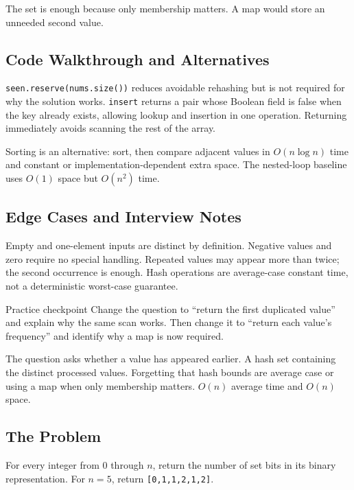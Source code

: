 The set is enough because only membership matters. A map would store an
unneeded second value.

\subsection{Code Walkthrough and Alternatives}
\texttt{seen.reserve(nums.size())} reduces avoidable rehashing but is not
required for why the solution works. \texttt{insert} returns a pair whose Boolean field
is false when the key already exists, allowing lookup and insertion in one
operation. Returning immediately avoids scanning the rest of the array.

Sorting is an alternative: sort, then compare adjacent values in
\(O(n\log n)\) time and constant or implementation-dependent extra space.
The nested-loop baseline uses \(O(1)\) space but \(O(n^2)\) time.

\subsection{Edge Cases and Interview Notes}
Empty and one-element inputs are distinct by definition. Negative values and
zero require no special handling. Repeated values may appear more than twice;
the second occurrence is enough. Hash operations are average-case constant
time, not a deterministic worst-case guarantee.

\begin{revisionbox}{Practice checkpoint}
Change the question to ``return the first duplicated value'' and explain why
the same scan works. Then change it to ``return each value's frequency'' and
identify why a map is now required.
\end{revisionbox}
\chaptercheckpoint
  {The question asks whether a value has appeared earlier.}
  {A hash set containing the distinct processed values.}
  {Forgetting that hash bounds are average case or using a map when only membership matters.}
  {$O(n)$ average time and $O(n)$ space.}
\judgeclassnote



\subsection{The Problem}
For every integer from \(0\) through \(n\), return the number of set bits in
its binary representation. For \(n=5\), return \texttt{[0,1,1,2,1,2]}.

